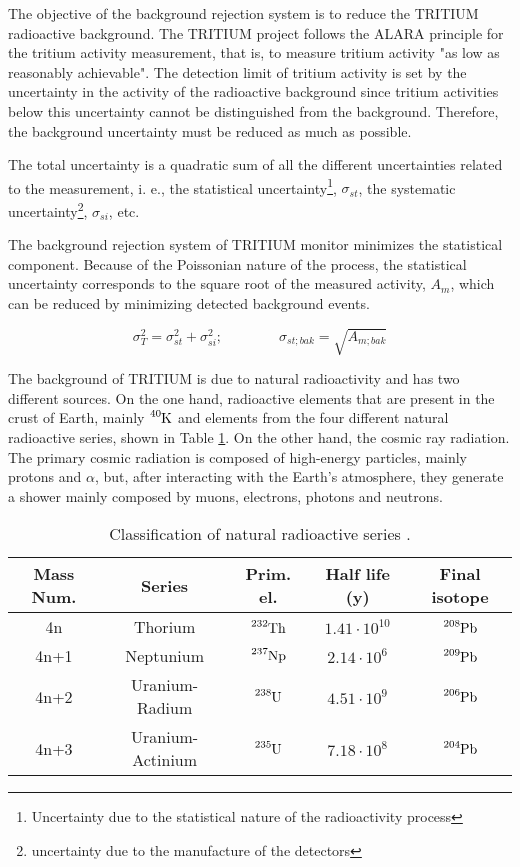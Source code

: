 The objective of the background rejection system is to reduce the TRITIUM radioactive background. The TRITIUM project follows the ALARA principle for the tritium activity measurement, that is, to measure tritium activity "as low as reasonably achievable". The detection limit of tritium activity is set by the uncertainty in the activity of the radioactive background since tritium activities below this uncertainty cannot be distinguished from the background. Therefore, the background uncertainty must be reduced as much as possible.

The total uncertainty is a quadratic sum of all the different uncertainties related to the measurement, i. e., the statistical uncertainty\footnote{Uncertainty due to the statistical nature of the radioactivity process}, $\sigma_{st}$, the systematic uncertainty\footnote{uncertainty due to the manufacture of the detectors}, $\sigma_{si}$, etc.

The background rejection system of TRITIUM monitor minimizes the statistical component. Because of the Poissonian nature of the process, the statistical uncertainty corresponds to the square root of the measured activity, $A_{m}$, which can be reduced by minimizing detected background events.

\begin{equation}
\sigma_{T}^2 = \sigma_{st}^2 +\sigma_{si}^2; \qquad \qquad \sigma_{st;bak} = \sqrt{A_{m;bak}}
\label{eq:SquareSumUncerainty}
\end{equation} 

The background of TRITIUM is due to natural radioactivity and has two different sources. On the one hand, radioactive elements that are present in the crust of Earth, mainly $\ce{^{40}K}$ and elements from the four different natural radioactive series, shown in Table \ref{tab:NaturalRadioactiveSeries}. On the other hand, the cosmic ray radiation. The primary cosmic radiation is composed of high-energy particles, mainly protons and $\alpha$, but, after interacting with the Earth's atmosphere, they generate a shower mainly composed by muons, electrons, photons and neutrons.

\begin{table}[htbp]
\begin{center}
\begin{tabular}{|c|c|c|c|c|}
\hline
Mass Num. & Series & Prim. el. & Half life (y) & Final isotope \\
\hline \hline \hline
4n & Thorium & $\ce{^{232}Th}$ & $1.41 \cdot{} 10^{10}$ & $\ce{^{208}Pb}$ \\ \hline
4n+1 & Neptunium & $\ce{^{237}Np}$ & $2.14 \cdot{} 10^{6}$ & $\ce{^{209}Pb}$ \\ \hline
4n+2 & Uranium-Radium & $\ce{^{238}U}$ & $4.51 \cdot{} 10^{9}$ & $\ce{^{206}Pb}$ \\ \hline
4n+3 & Uranium-Actinium & $\ce{^{235}U}$ & $7.18 \cdot{} 10^{8}$ & $\ce{^{204}Pb}$ \\ \hline
\end{tabular}
\caption{Classification of natural radioactive series \cite{NaturalRadioactiveSeries1, NaturalRadioactiveSeries2}.}
\label{tab:NaturalRadioactiveSeries}
\end{center}
\end{table}

